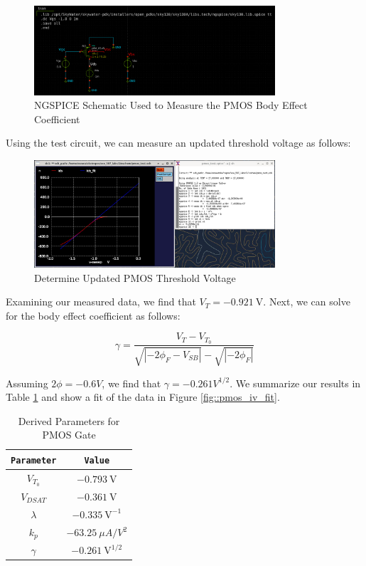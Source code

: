 \documentclass[fleqn]{article}
\begin{document}
	 \begin{figure}[H]
		\centerline{\includegraphics[width=0.8\textwidth]{pmos_gamma_meas_schem.png}}
		\caption{NGSPICE Schematic Used to Measure the PMOS Body Effect Coefficient}
		\label{fig::pmos_gamma_meas_schem}
	\end{figure}
	
	\noindent Using the test circuit, we can measure an updated threshold voltage as follows:
	
	\begin{figure}[H]
		\centerline{\includegraphics[width=0.8\textwidth]{pmos_gamma_meas.png}}
		\caption{Determine Updated PMOS Threshold Voltage}
		\label{fig::pmos_gamma_meas}
	\end{figure}
	
	\noindent Examining our measured data, we find that $V_T = -0.921\ \text{V}$. Next, we can solve for the body effect coefficient as follows:
	
	\begin{equation}
		\gamma = \frac{V_T - V_{T_0}}{\sqrt{|-2\phi_F - V_{SB}|} - {\sqrt{|-2\phi_F|}}} 
	\end{equation}
	
	\noindent Assuming $2\phi = -0.6 V$, we find that $\gamma = -0.261 V^{1/2}$. We summarize our results in Table \ref{table::pmos_derived_params} and show a fit of the data in Figure \ref{fig::pmos_iv_fit}.
	
	\begin{table}[H]
	\begin{center}
	\caption{Derived Parameters for PMOS Gate}
	\label{table::pmos_derived_params}
	\begin{tabular}{| c | c |}
		\hline
		\texttt{Parameter} & \texttt{Value}\\
		\hline	
		$V_{T_0}$ & $-0.793\ \text{V}$ \\
		\hline	
		$V_{DSAT}$ & $-0.361\ \text{V}$ \\
		\hline	
		$\lambda$ & $-0.335\ \text{V}^{-1}$\\
		\hline	
		$k_p$ & $-63.25\ {\mu}A/V^2$\\
		\hline	
		$\gamma$ & $-0.261\ \text{V}^{1/2}$\\
		\hline
	\end{tabular}
	\end{center}
	\end{table}
	
\end{document}
